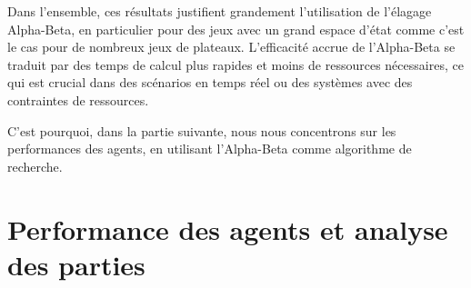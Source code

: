 Dans l'ensemble, ces résultats justifient grandement l'utilisation de l'élagage Alpha-Beta, en particulier pour des jeux avec un grand espace d'état comme c'est le cas pour de nombreux jeux de plateaux. L'efficacité accrue de l'Alpha-Beta se traduit par des temps de calcul plus rapides et moins de ressources nécessaires, ce qui est crucial dans des scénarios en temps réel ou des systèmes avec des contraintes de ressources.

C'est pourquoi, dans la partie suivante, nous nous concentrons sur les performances des agents, en utilisant l'Alpha-Beta comme algorithme de recherche.

\section{Performance des agents et analyse des parties}
